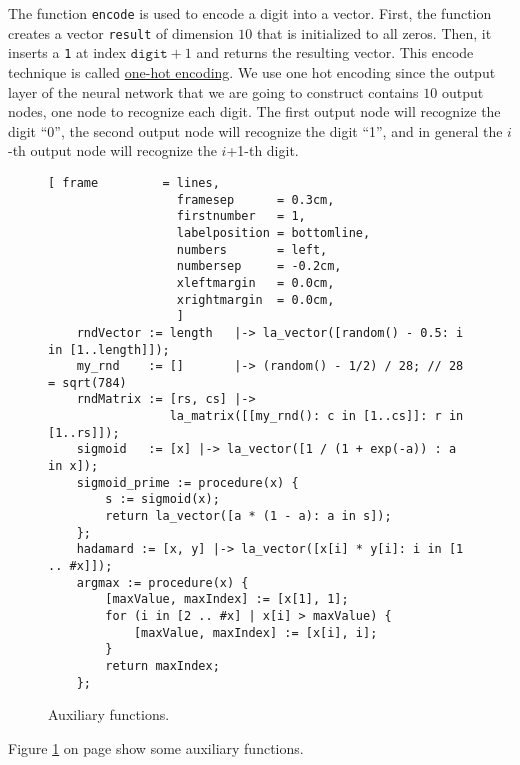 The function \texttt{encode} is used to encode a digit into a vector.  First, the function creates a vector
\texttt{result} of dimension $10$ that is initialized to all zeros.  Then, it inserts a \texttt{1} at index
$\texttt{digit}+1$ and returns the resulting vector.  This encode technique is called
\href{https://en.wikipedia.org/wiki/One-hot}{one-hot encoding}.  We use one hot encoding since the output layer
of the neural network that we are going to construct contains $10$ output nodes, one node to recognize each
digit.  The first output node will recognize the digit ``0'', the second output node will recognize the digit
``1'', and in general the $i$-th output node will recognize the $i$+1-th digit.

\begin{figure}[!ht]
\centering
\begin{Verbatim}[ frame         = lines, 
                  framesep      = 0.3cm, 
                  firstnumber   = 1,
                  labelposition = bottomline,
                  numbers       = left,
                  numbersep     = -0.2cm,
                  xleftmargin   = 0.0cm,
                  xrightmargin  = 0.0cm,
                  ]
    rndVector := length   |-> la_vector([random() - 0.5: i in [1..length]]);
    my_rnd    := []       |-> (random() - 1/2) / 28; // 28 = sqrt(784)
    rndMatrix := [rs, cs] |->
                 la_matrix([[my_rnd(): c in [1..cs]]: r in [1..rs]]);
    sigmoid   := [x] |-> la_vector([1 / (1 + exp(-a)) : a in x]);
    sigmoid_prime := procedure(x) {
        s := sigmoid(x); 
        return la_vector([a * (1 - a): a in s]);
    };
    hadamard := [x, y] |-> la_vector([x[i] * y[i]: i in [1 .. #x]]);
    argmax := procedure(x) {
        [maxValue, maxIndex] := [x[1], 1];
        for (i in [2 .. #x] | x[i] > maxValue) {
            [maxValue, maxIndex] := [x[i], i];
        }
        return maxIndex;
    };
\end{Verbatim}
\vspace*{-0.3cm}
\caption{Auxiliary functions.}
\label{fig:nn.stlx:auxiliary}
\end{figure}
Figure \ref{fig:nn.stlx:auxiliary} on page \pageref{fig:nn.stlx:auxiliary} show some auxiliary functions.
